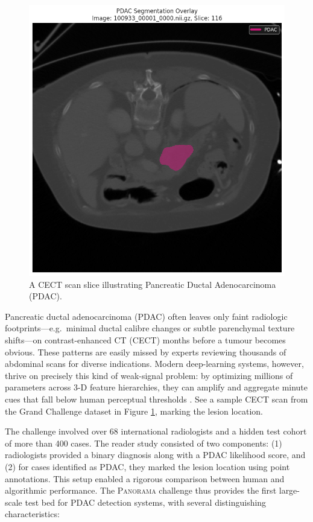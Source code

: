 \documentclass[conference]{IEEEtran}
\begin{document}
\begin{figure}[htbp]
  \centering
  \includegraphics[width=0.75\linewidth]{./figures/pdac_sample.png}
  \caption{A CECT scan slice illustrating Pancreatic Ductal Adenocarcinoma (PDAC).}
  \label{fig:ct_scan}
\end{figure}

Pancreatic ductal adenocarcinoma (PDAC) often leaves only faint radiologic footprints—e.g.\ minimal ductal calibre changes or subtle parenchymal texture shifts—on contrast-enhanced CT (CECT) months before a tumour becomes obvious.  These patterns are easily missed by experts reviewing thousands of abdominal scans for diverse indications.  Modern deep-learning systems, however, thrive on precisely this kind of weak-signal problem: by optimizing millions of parameters across 3-D feature hierarchies, they can amplify and aggregate minute cues that fall below human perceptual thresholds \cite{b7, b8}. See a sample CECT scan from the Grand Challenge dataset in Figure \ref{fig:ct_scan}, marking the lesion location.

The challenge involved over 68 international radiologists and a hidden test cohort of more than 400 cases. The reader study consisted of two components: (1) radiologists provided a binary diagnosis along with a PDAC likelihood score, and (2) for cases identified as PDAC, they marked the lesion location using point annotations. This setup enabled a rigorous comparison between human and algorithmic performance. The \textsc{Panorama} challenge thus provides the first large-scale test bed for PDAC detection systems, with several distinguishing characteristics:
\end{document}

